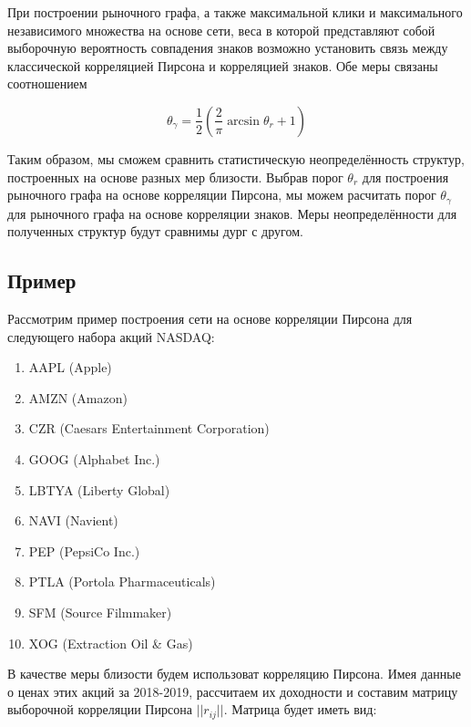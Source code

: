При построении  рыночного графа, а также максимальной клики и максимального независимого множества на основе сети, веса в которой представляют собой выборочную вероятность совпадения знаков возможно установить связь между классической корреляцией Пирсона и корреляцией знаков\cite{signs}. Обе меры связаны соотношением

\begin{equation}
	\theta_\gamma = \frac{1}{2}\left(\frac{2}{\pi}\arcsin\theta_r +1\right)
	\label{eq:threshold}
\end{equation}

Таким образом, мы сможем сравнить статистическую неопределённость структур, построенных на основе разных мер близости. Выбрав порог $\theta_r$ для построения рыночного графа на основе корреляции Пирсона, мы можем расчитать порог $\theta_{\gamma}$ для рыночного графа на основе корреляции знаков. Меры неопределённости для полученных структур будут сравнимы дург с другом.



\subsection{Пример}

Рассмотрим пример построения сети на основе корреляции Пирсона для следующего набора акций NASDAQ: 

{ \small
\begin{enumerate}
  \item AAPL (Apple)
  \item AMZN (Amazon)
  \item CZR (Caesars Entertainment Corporation)
  \item GOOG (Alphabet Inc.)
  \item LBTYA (Liberty Global)
  \item NAVI (Navient)
  \item PEP (PepsiCo Inc.)
  \item PTLA (Portola Pharmaceuticals)
  \item SFM (Source Filmmaker)
  \item XOG (Extraction Oil \& Gas)
\end{enumerate}
}
В качестве меры близости будем использоват корреляцию Пирсона. Имея данные о ценах этих акций за 2018-2019, рассчитаем их доходности и составим матрицу выборочной корреляции Пирсона $ ||r_{ij}|| $. Матрица будет иметь вид:

